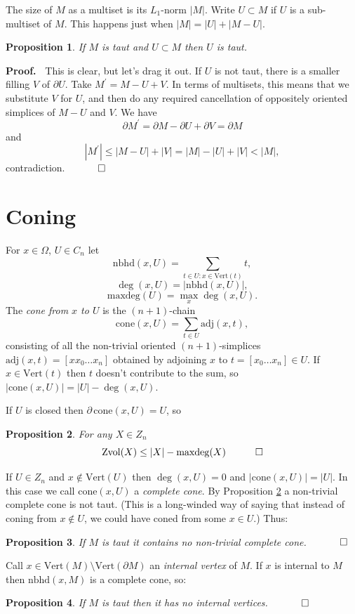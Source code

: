 \documentclass[12pt]{article}
\newtheorem{prop}{Proposition}
\newcommand{\proofstart}{{\noindent \bf Proof.\ }}
\newcommand{\mathproofend}{\quad \qed}
\newcommand{\proofend}{$\quad \qed$}
\def\del{\partial}
\newcommand{\kw}{\mathrm}
\newcommand{\cone}{\kw{cone}}
\newcommand{\maxdeg}{\kw{maxdeg}}
\newcommand{\vertices}{\kw{Vert}}
\newcommand{\nbhd}{\kw{nbhd}}
\newcommand{\adj}{\kw{adj}}
\newcommand{\Zvol}{\kw{Zvol}}
\begin{document}
The size of $M$ as a multiset is its $L_1$-norm $|M|$.
Write $U \subset M$
if $U$ is a sub-multiset of $M$.
This happens just when
$|M| = |U| + |M-U|$.

\begin{prop} \label{subtaut}
If $M$ is taut and $U \subset M$ then $U$ is taut.
\end{prop}

\proofstart
This is clear, but let's drag it out.
If $U$ is not taut, there is a smaller filling $V$ of $\del U$.
Take $M^\prime = M-U+V$.
In terms of multisets, this means that we substitute $V$ for $U$,
and then do any required cancellation of oppositely oriented simplices
of $M-U$ and $V$.
We have
\[
\del M^\prime = \del M - \del U + \del V = \del M
\]
and
\[
|M^\prime| \leq |M-U| + |V| = |M| - |U| + |V| < |M|
,
\]
contradiction.
\proofend

\section{Coning}
For $x \in \Omega$, $U \in C_n$ let
\[
\nbhd(x,U) = \sum_{ t \in U: x \in \vertices(t) } t
,
\]
\[
\deg(x,U) = |\nbhd(x,U)|
,
\]
\[
\maxdeg(U) = \max_x \deg(x,U)
.
\]
The \emph{cone from $x$ to $U$}
is the $(n+1)$-chain
\[
\cone(x,U) = 
\sum_{t \in U} \adj(x,t)
,
\]
consisting of all the non-trivial oriented
$(n+1)$-simplices $\adj(x,t)=[x x_0\ldots x_n]$ obtained
by adjoining $x$ to  $t = [x_0\ldots x_n] \in U$.
If $x \in \vertices(t)$ then $t$ doesn't contribute to the sum,
so $|\cone(x,U)| = |U| - \deg(x,U)$.

If $U$ is closed then
$\del\, \cone(x,U) = U$, so

\begin{prop} \label{maxdeg}
For any $X \in Z_n$
\[
\Zvol(X) \leq |X| - \maxdeg(X)
\mathproofend
\]
\end{prop}

If $U \in Z_n$ and $x \notin \vertices(U)$ then
$\deg(x,U)=0$ and
$|\cone(x,U)| = |U|$.
In this case we call $\cone(x,U)$ a \emph{complete cone}.
By Proposition \ref{maxdeg} a non-trivial complete cone is not taut.
(This is a long-winded way of saying that instead of coning from
$x \notin U$, we could have coned from some $x \in U$.)
Thus:
\begin{prop}\label{nocone}
If $M$ is taut it contains no non-trivial complete cone.
\proofend
\end{prop}

Call $x \in \vertices(M) \setminus \vertices(\del M)$ an
\emph{internal vertex} of $M$.
If $x$ is internal to $M$ then $\nbhd(x,M)$ is a complete cone, so:
\begin{prop} \label{nointernal}
If $M$ is taut then
it has no internal vertices.
\proofend
\end{prop}
\end{document}
